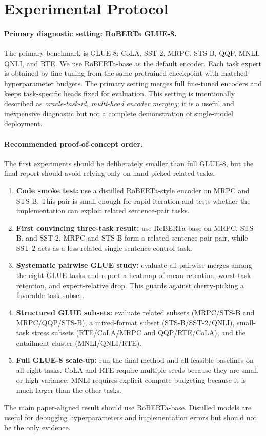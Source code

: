 \documentclass[11pt]{article}
\begin{document}
\section{Experimental Protocol}

\paragraph{Primary diagnostic setting: RoBERTa GLUE-8.}
The primary benchmark is GLUE-8: CoLA, SST-2, MRPC, STS-B, QQP, MNLI, QNLI, and RTE. We use RoBERTa-base as the default encoder. Each task expert is obtained by fine-tuning from the same pretrained checkpoint with matched hyperparameter budgets. The primary setting merges full fine-tuned encoders and keeps task-specific heads fixed for evaluation. This setting is intentionally described as \emph{oracle-task-id, multi-head encoder merging}; it is a useful and inexpensive diagnostic but not a complete demonstration of single-model deployment.

\paragraph{Recommended proof-of-concept order.}
The first experiments should be deliberately smaller than full GLUE-8, but the final report should avoid relying only on hand-picked related tasks.
\begin{enumerate}[leftmargin=*]
    \item \textbf{Code smoke test:} use a distilled RoBERTa-style encoder \citep{sanh2019distilbert} on MRPC and STS-B. This pair is small enough for rapid iteration and tests whether the implementation can exploit related sentence-pair tasks.
    \item \textbf{First convincing three-task result:} use RoBERTa-base on MRPC, STS-B, and SST-2. MRPC and STS-B form a related sentence-pair pair, while SST-2 acts as a less-related single-sentence control task.
    \item \textbf{Systematic pairwise GLUE study:} evaluate all pairwise merges among the eight GLUE tasks and report a heatmap of mean retention, worst-task retention, and expert-relative drop. This guards against cherry-picking a favorable task subset.
    \item \textbf{Structured GLUE subsets:} evaluate related subsets (MRPC/STS-B and MRPC/QQP/STS-B), a mixed-format subset (STS-B/SST-2/QNLI), small-task stress subsets (RTE/CoLA/MRPC and QQP/RTE/CoLA), and the entailment cluster (MNLI/QNLI/RTE).
    \item \textbf{Full GLUE-8 scale-up:} run the final method and all feasible baselines on all eight tasks. CoLA and RTE require multiple seeds because they are small or high-variance; MNLI requires explicit compute budgeting because it is much larger than the other tasks.
\end{enumerate}
The main paper-aligned result should use RoBERTa-base. Distilled models are useful for debugging hyperparameters and implementation errors but should not be the only evidence.
\end{document}
